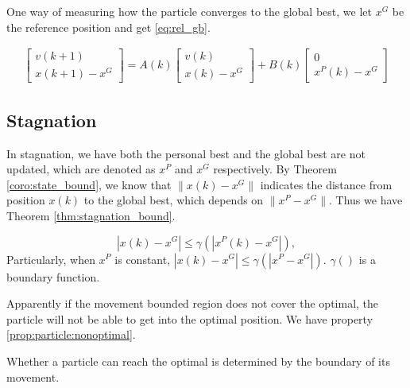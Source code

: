 One way of measuring how the particle converges to the global best, we let $ x^{G} $ be the reference position and get \eqref{eq:rel_gb}.

\begin{equation}
\label{eq:rel_gb}
\begin{aligned}
\begin{bmatrix}
v(k+1) \\
x(k+1) - x^{G}
\end{bmatrix}
 = A(k) 
\begin{bmatrix}
v(k) \\
x(k) - x^{G}
\end{bmatrix}
+ B(k) 
\begin{bmatrix}
0 \\
x^{P}(k) - x^{G}
\end{bmatrix}
\end{aligned}
\end{equation}

\subsection{Stagnation}

In stagnation, we have both the personal best and the global best are not updated, which are denoted as $ x^{P} $ and $ x^{G} $ respectively.
By Theorem \ref{coro:state_bound}, we know that $ \lVert x(k) - x^{G} \rVert $ indicates the distance from position $ x(k) $ to the global best, which depends on  $ \lVert x^{P} - x^{G} \rVert $.
Thus we have Theorem \ref{thm:stagnation_bound}.

\begin{mythm}
\label{thm:stagnation_bound}
\begin{equation}
| x(k) - x^{G} | \leq \gamma ( | x^{P}(k) - x^{G} | ), 
\end{equation}
Particularly, when $ x^{P} $ is constant,
$  | x(k) - x^{G} | \leq \gamma ( | x^{P} - x^{G} | ). $
$ \gamma () $ is a boundary function.
\end{mythm}

Apparently if the movement bounded region does not cover the optimal, the particle will not be able to get into the optimal position.
We have property \ref{prop:particle:nonoptimal}.

\begin{myprop}
\label{prop:particle:nonoptimal}
Whether a particle can reach the optimal is determined by the boundary of its movement.
\end{myprop}

